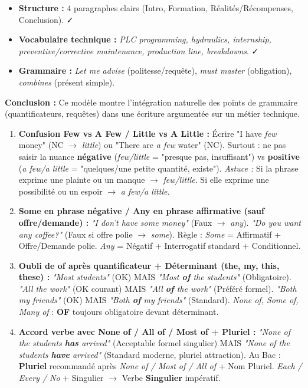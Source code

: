 \documentclass[11pt]{article}
\newcommand{\cle}[1]{{\popxbold\color{popdark}#1}}
\begin{document}
\begin{exoresolu}
\begin{itemize}
        \item \textbf{Structure :} 4 paragraphes clairs (Intro, Formation, Réalités/Récompenses, Conclusion). ✓
        \item \textbf{Vocabulaire technique :} \emph{PLC programming, hydraulics, internship, preventive/corrective maintenance, production line, breakdowns}. ✓
        \item \textbf{Grammaire :} \emph{Let me advise} (politesse/requête), \emph{must master} (obligation), \emph{combines} (présent simple).
    \end{itemize}
    \textbf{Conclusion :} Ce modèle montre l'intégration naturelle des points de grammaire (quantificateurs, requêtes) dans une écriture argumentée sur un métier technique.
\end{exoresolu}

\begin{attention}
    \begin{enumerate}
        \item \textbf{Confusion \cle{Few} vs \cle{A Few} / \cle{Little} vs \cle{A Little} :} Écrire "I have \emph{few} money" (NC $\rightarrow$ \emph{little}) ou "There are \emph{a few} water" (NC). Surtout : ne pas saisir la nuance \textbf{négative} (\emph{few/little} = "presque pas, insuffisant") vs \textbf{positive} (\emph{a few/a little} = "quelques/une petite quantité, existe"). \textit{Astuce :} Si la phrase exprime une plainte ou un manque $\rightarrow$ \emph{few/little}. Si elle exprime une possibilité ou un espoir $\rightarrow$ \emph{a few/a little}.
        \item \textbf{\cle{Some} en phrase négative / \cle{Any} en phrase affirmative (sauf offre/demande) :} \emph{"I don't have some money"} (Faux $\rightarrow$ \emph{any}). \emph{"Do you want any coffee?"} (Faux si offre polie $\rightarrow$ \emph{some}). Règle : \emph{Some} = Affirmatif + Offre/Demande polie. \emph{Any} = Négatif + Interrogatif standard + Conditionnel.
        \item \textbf{Oubli de \cle{of} après quantificateur + Déterminant (the, my, this, these) :} \emph{"Most students"} (OK) MAIS \emph{"Most \textbf{of} the students"} (Obligatoire). \emph{"All the work"} (OK courant) MAIS \emph{"All \textbf{of} the work"} (Préféré formel). \emph{"Both my friends"} (OK) MAIS \emph{"Both \textbf{of} my friends"} (Standard). \emph{None of, Some of, Many of} : \textbf{OF} toujours obligatoire devant déterminant.
        \item \textbf{Accord verbe avec \cle{None of} / \cle{All of} / \cle{Most of} + Pluriel :} \emph{"None of the students \textbf{has} arrived"} (Acceptable formel singulier) MAIS \emph{"None of the students \textbf{have} arrived"} (Standard moderne, pluriel attraction). Au Bac : \textbf{Pluriel} recommandé après \emph{None of / Most of / All of} + Nom Pluriel. \emph{Each / Every / No} + Singulier $\rightarrow$ Verbe \textbf{Singulier} impératif.

\end{enumerate}
\end{attention}
\end{document}
